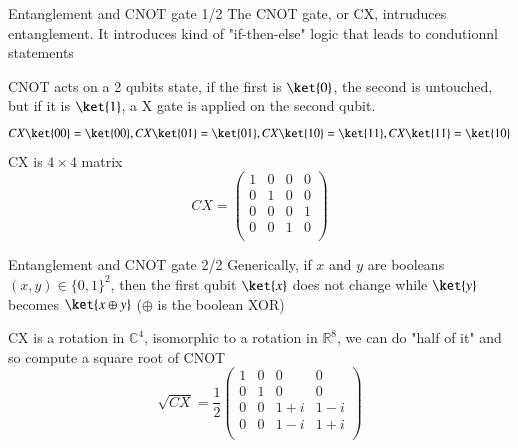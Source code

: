 \begin{frame}{Entanglement and CNOT gate 1/2}
The CNOT gate, or CX, intruduces entanglement. It introduces kind of "if-then-else" logic that leads to condutionnl 
statements\newline

CNOT acts on a 2 qubits state, if the first is $\ket{0}$, the second is untouched, but if it is $\ket{1}$, a X gate is 
applied on the second qubit.
\begin{equation*}
    CX\ket{00} = \ket{00}, CX\ket{01} = \ket{01}, CX\ket{10} = \ket{11}, CX\ket{11} = \ket{10}
\end{equation*}
CX is $4 \times 4$ matrix
\begin{equation*}
    CX = \begin{pmatrix} 1 & 0 & 0 & 0 \\ 0 & 1 & 0 & 0 \\ 0 & 0 & 0 & 1 \\ 0 & 0 & 1 & 0 \\ \end{pmatrix}
\end{equation*}
\end{frame}

\begin{frame}{Entanglement and CNOT gate 2/2}
Generically, if $x$ and $y$ are booleans  $(x,y) \in \{0,1\}^2$, then the first qubit $\ket{x}$  does not change while
 $\ket{y}$ becomes $\ket{x \oplus y}$ ($\oplus$ is the boolean XOR)
\begin{center}
\end{center}   
CX is a rotation in $\mathbb{C}^4$, isomorphic to a rotation in $\mathbb{R}^8$, we can do "half of it" and so compute a 
square root of CNOT
\begin{equation*}
\sqrt{CX} = \frac{1}{2}
            \begin{pmatrix}
                1 & 0 & 0 & 0 \\
                0 & 1 & 0 & 0 \\
                0 & 0 & 1+i & 1-i \\
                0 & 0 & 1-i & 1+i \\
            \end{pmatrix}   
\end{equation*}
\end{frame}

